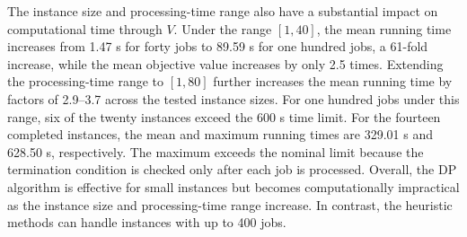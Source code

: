 \documentclass[12pt]{article}
\begin{document}
\begin{sloppypar}
        The instance size and processing-time range also have a substantial impact on computational time through \(V\). 
        Under the range \([1,40]\),
        the mean running time increases from 1.47 s for forty jobs to 89.59 s for one hundred jobs, 
        a 61-fold increase, while the mean objective value increases by only 2.5 times. 
        Extending the processing-time range to \([1,80]\) further increases the mean running time by factors of
        2.9--3.7 across the tested instance sizes. 
        For one hundred jobs under this range, six of the twenty instances exceed the 600 s time limit.
        For the fourteen completed instances, the mean and maximum running times are 329.01 s and 628.50 s,
        respectively. The maximum exceeds the nominal limit because the termination condition is checked only after
        each job is processed. 
        Overall, the DP algorithm is effective for small instances but becomes computationally impractical as the
        instance size and processing-time range increase. 
        In contrast, the heuristic methods can handle instances with up to 400 jobs.
        

\end{sloppypar}
\end{document}
